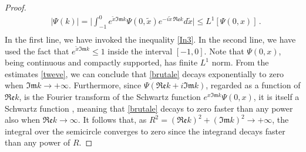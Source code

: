 \documentclass[prl, amsfonts, amssymb, amsmath, nofootinbib,reprint, showkeys, twoside,notitlepage]{revtex4-2}
\theoremstyle{definition}
\theoremstyle{theorem}
\theoremstyle{corollary}
\begin{document}
\begin{proof}
\begin{equation}
\begin{split}
& |\Psi(k)|=\bigg|\int_{-1}^0 e^{\tilde{x} \mathfrak{Im} k}\Psi(0,\tilde{x})e^{-i\tilde{x} \, \mathfrak{Re} k}d\tilde{x} \bigg| \leq L^1[\Psi(0,x)] \, . \\
\end{split}
\end{equation}
In the first line, we have invoked the inequality \eqref{In3}. In the second line, we have used the fact that $e^{\tilde{x} \mathfrak{Im} k} \leq 1$ inside the interval $[-1,0]$. Note that $\Psi(0,x)$, being continuous and compactly supported, has finite $L^1$ norm. From the estimates \eqref{tweve}, we can conclude that \eqref{brutale} decays exponentially to zero when $\mathfrak{Im} k \rightarrow +\infty$. Furthermore, since $\Psi(\mathfrak{Re} k +i \mathfrak{Im} k)$, regarded as a function of $\mathfrak{Re}k$, is the Fourier transform of the  Schwartz function $e^{x \mathfrak{Im} k}\Psi(0,x)$, it is itself a Schwartz function \cite{Hormander_book}, meaning that \eqref{brutale} decays to zero faster than any power also when $\mathfrak{Re}k \rightarrow \infty$. It follows that, as $R^2= (\mathfrak{Re}k)^2+(\mathfrak{Im}k)^2 \rightarrow +\infty$, the integral over the semicircle converges to zero since the integrand decays faster than any power of $R$.  
\end{proof}
\end{document}
